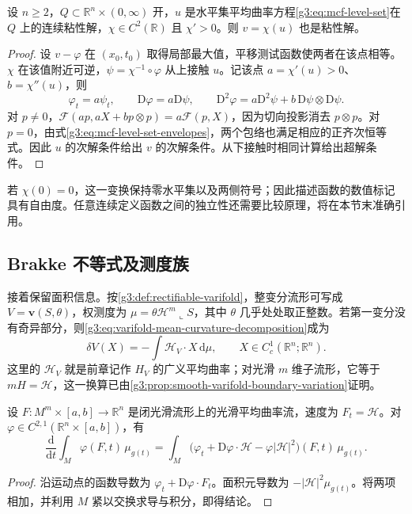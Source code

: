 \begin{proposition}\label{g3:prop:mcf-level-set-relabel}
	设 \(n\ge2\)，\(Q\subset\mathbb R^n\times(0,\infty)\) 开，\(u\) 是水平集平均曲率方程\eqref{g3:eq:mcf-level-set}在 \(Q\) 上的连续粘性解，\(\chi\in C^2(\mathbb R)\) 且 \(\chi'>0\)。则 \(v=\chi(u)\) 也是粘性解。
\end{proposition}
\begin{proof}
	设 \(v-\varphi\) 在 \((x_0,t_0)\) 取得局部最大值，平移测试函数使两者在该点相等。\(\chi\) 在该值附近可逆，\(\psi=\chi^{-1}\circ\varphi\) 从上接触 \(u\)。记该点 \(a=\chi'(u)>0\)、\(b=\chi''(u)\)，则
	\[
	\varphi_t=a\psi_t,\qquad
	\mathrm D\varphi=a\mathrm D\psi,\qquad
	\mathrm D^2\varphi=a\mathrm D^2\psi+b\,\mathrm D\psi\otimes\mathrm D\psi.
	\]
	对 \(p\ne0\)，\(\mathcal F(ap,aX+bp\otimes p)=a\mathcal F(p,X)\)，因为切向投影消去 \(p\otimes p\)。对 \(p=0\)，由式\eqref{g3:eq:mcf-level-set-envelopes}，两个包络也满足相应的正齐次恒等式。因此 \(u\) 的次解条件给出 \(v\) 的次解条件。从下接触时相同计算给出超解条件。
\end{proof}

若 \(\chi(0)=0\)，这一变换保持零水平集以及两侧符号；因此描述函数的数值标记具有自由度。任意连续定义函数之间的独立性还需要比较原理，将在本节末准确引用。

\subsection{Brakke 不等式及测度族}
\label{g3:subsec:2804:02}
接着保留面积信息。按\cref{g3:def:rectifiable-varifold}，整变分流形可写成 \(V=\mathbf v(S,\theta)\)，权测度为 \(\mu=\theta\mathcal H^m\llcorner S\)，其中 \(\theta\) 几乎处处取正整数。若第一变分没有奇异部分，则\eqref{g3:eq:varifold-mean-curvature-decomposition}成为
\begin{equation}\label{g3:eq:brakke-mean-curvature}
	\delta V(X)=-\int\mathcal H_V\cdot X\,\mathrm d\mu,
	\qquad X\in C_c^1(\mathbb R^n;\mathbb R^n).
\end{equation}
这里的 \(\mathcal H_V\) 就是前章记作 \(H_V\) 的广义平均曲率；对光滑 \(m\) 维子流形，它等于 \(mH=\mathcal H\)，这一换算已由\cref{g3:prop:smooth-varifold-boundary-variation}证明。

\begin{proposition}\label{g3:prop:mcf-weighted-area-transport}
	设 \(F:M^m\times[a,b]\to\mathbb R^n\) 是闭光滑流形上的光滑平均曲率流，速度为 \(F_t=\mathcal H\)。对 \(\varphi\in C^{2,1}(\mathbb R^n\times[a,b])\)，有
	\begin{equation}\label{g3:eq:mcf-weighted-area-transport}
		\frac{\mathrm d}{\mathrm dt}\int_M\varphi(F,t)\,\mu_{g(t)}
		=\int_M\bigl(\varphi_t+\mathrm D\varphi\cdot\mathcal H
		-\varphi|\mathcal H|^2\bigr)(F,t)\,\mu_{g(t)}.
	\end{equation}
\end{proposition}
\begin{proof}
	沿运动点的函数导数为 \(\varphi_t+\mathrm D\varphi\cdot F_t\)。面积元导数为 \(-|\mathcal H|^2\mu_{g(t)}\)。将两项相加，并利用 \(M\) 紧以交换求导与积分，即得结论。
\end{proof}

